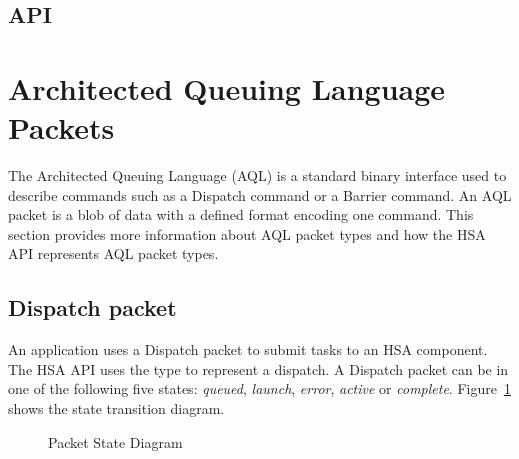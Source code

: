 \documentclass[final]{book}
\begin{document}
\subsection{API}


\section{Architected Queuing Language Packets}\label{sec:aql}
The Architected Queuing Language (AQL) is a standard binary interface used to
describe commands such as a Dispatch command or a Barrier command. An AQL packet
is a blob of data with a defined format encoding one command. This section
provides more information about AQL packet types and how the HSA API represents
AQL packet types.

\subsection{Dispatch packet}\label{dispatch-packet}

An application uses a Dispatch packet to submit tasks to an HSA component. The
HSA API uses the  type to represent a dispatch.
A Dispatch packet can be in one of the following five states: \emph{queued},
\emph{launch}, \emph{error}, \emph{active} or
\emph{complete}. Figure~\ref{fig:packetstate} shows the state transition
diagram.

\begin{figure}[b]
  \centering
  \scriptsize
{}
  \centering
  \caption{Packet State Diagram}
  \label{fig:packetstate}
\end{figure}
\end{document}
